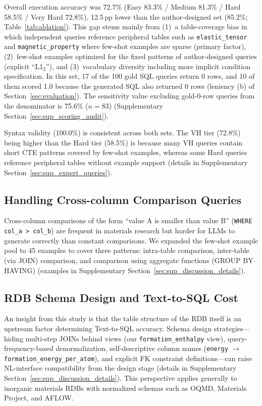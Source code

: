 Overall execution accuracy was 72.7\% (Easy 83.3\% / Medium 81.3\% / Hard 58.5\% / Very Hard 72.8\%), 12.5\,pp lower than the author-designed set (85.2\%; Table~\ref{tab:ablation}). This gap stems mainly from (1)~a table-coverage bias in which independent queries reference peripheral tables such as \texttt{elastic\_tensor} and \texttt{magnetic\_property} where few-shot examples are sparse (primary factor), (2)~few-shot examples optimized for the fixed patterns of author-designed queries (explicit ``L1$_2$''), and (3)~vocabulary diversity including more implicit condition specification. In this set, 17 of the 100 gold SQL queries return 0 rows, and 10 of them scored 1.0 because the generated SQL also returned 0 rows (leniency (b) of Section~\ref{sec:evaluation}). The sensitivity value excluding gold-0-row queries from the denominator is 75.6\% ($n=83$) (Supplementary Section~\ref{sec:sup_scoring_audit}).

Syntax validity (100.0\%) is consistent across both sets. The VH tier (72.8\%) being higher than the Hard tier (58.5\%) is because many VH queries contain short CTE patterns covered by few-shot examples, whereas some Hard queries reference peripheral tables without example support (details in Supplementary Section~\ref{sec:sup_expert_queries}).

\subsection{Handling Cross-column Comparison Queries}
\label{sec:column_comparison}

Cross-column comparisons of the form ``value A is smaller than value B'' (\texttt{WHERE col\_a > col\_b}) are frequent in materials research but harder for LLMs to generate correctly than constant comparisons. We expanded the few-shot example pool to 45 examples to cover three patterns: intra-table comparison, inter-table (via JOIN) comparison, and comparison using aggregate functions (GROUP BY--HAVING) (examples in Supplementary Section~\ref{sec:sup_discussion_details}).

\subsection{RDB Schema Design and Text-to-SQL Cost}
\label{sec:schema_design_cost}

An insight from this study is that the table structure of the RDB itself is an upstream factor determining Text-to-SQL accuracy. Schema design strategies---hiding multi-step JOINs behind views (our \texttt{formation\_enthalpy} view), query-frequency-based denormalization, self-descriptive column names (\texttt{energy} $\to$ \texttt{formation\_energy\_per\_atom}), and explicit FK constraint definitions---can raise NL-interface compatibility from the design stage (details in Supplementary Section~\ref{sec:sup_discussion_details}). This perspective applies generally to inorganic materials RDBs with normalized schemas such as OQMD, Materials Project, and AFLOW.

